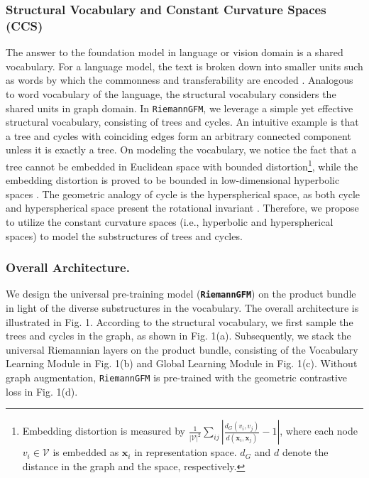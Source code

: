 \subsubsection*{\textbf{Structural Vocabulary and Constant Curvature Spaces (CCS)}}
The answer to the foundation model in language or vision domain is a shared vocabulary.
For a language model, the text is broken down into smaller units such as words by which the commonness and transferability are encoded \cite{chang2024surveyllm}.
Analogous to word vocabulary of the language, the structural vocabulary considers the shared units in graph domain.
In \texttt{RiemannGFM}, we leverage a simple yet effective structural vocabulary, consisting of trees and cycles.
An intuitive example is that a tree and cycles with coinciding edges form an arbitrary connected component unless it is exactly a tree.
On modeling the vocabulary, we notice the fact that a tree cannot be embedded in Euclidean space with bounded distortion\footnote{Embedding distortion is measured by $\frac{1}{|\mathcal V|^2} \sum_{ij}\left| \frac{d_G(v_i, v_j)}{d(\mathbf x_i, \mathbf x_j)}-1\right|$, where each node $v_i \in \mathcal V$ is embedded as $\mathbf x_i$ in representation space. $d_G$ and $d$ denote the distance in the graph and the space, respectively.},
while the embedding distortion is proved to be bounded in low-dimensional hyperbolic spaces \cite{2012lowDistort}.
The geometric analogy of cycle is the hyperspherical space, as both cycle and hyperspherical space present the rotational invariant \cite{Petersen16}.
Therefore, we propose to utilize the constant curvature spaces (i.e., hyperbolic and hyperspherical spaces) to model the substructures of trees and cycles.


\vspace{-0.07in}
\subsubsection*{\textbf{Overall Architecture.}}
We design the universal pre-training model (\textbf{\texttt{RiemannGFM}}) on the product bundle in light of the diverse substructures in the vocabulary.
The overall architecture is illustrated in Fig. 1.
According to the structural vocabulary, we first sample the trees and cycles in the graph, as shown in Fig. 1(a).
Subsequently, we stack the universal Riemannian layers  on the product bundle, consisting of the Vocabulary Learning Module in Fig. 1(b) and Global Learning Module in Fig. 1(c).
Without graph augmentation, \texttt{RiemannGFM} is pre-trained with the geometric contrastive loss in Fig. 1(d).



